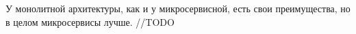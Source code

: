     У монолитной архитектуры, как и у микросервисной, есть свои преимущества, но в целом микросервисы лучше.
    //TODO

\clearpage
